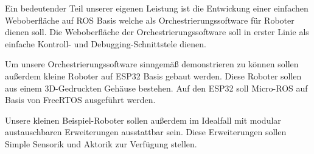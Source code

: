 \begin{flushleft}

    Ein bedeutender Teil unserer eigenen Leistung ist die Entwickung einer einfachen Weboberfläche auf ROS Basis welche als
    Orchestrierungssoftware für Roboter dienen soll.
    Die Weboberfläche der Orchestrierungssoftware soll in erster Linie als einfache Kontroll- und Debugging-Schnittstele dienen.
    
    Um unsere Orchestrierungssoftware sinngemäß demonstrieren zu können sollen außerdem kleine Roboter auf
    ESP32 Basis gebaut werden. Diese Roboter sollen aus einem 3D-Gedruckten Gehäuse bestehen.
    Auf den ESP32 soll Micro-ROS auf Basis von FreeRTOS ausgeführt werden.

    Unsere kleinen Beispiel-Roboter sollen außerdem im Idealfall mit modular austauschbaren Erweiterungen ausstattbar sein.
    Diese Erweiterungen sollen Simple Sensorik und Aktorik zur Verfügung stellen.
\end{flushleft}